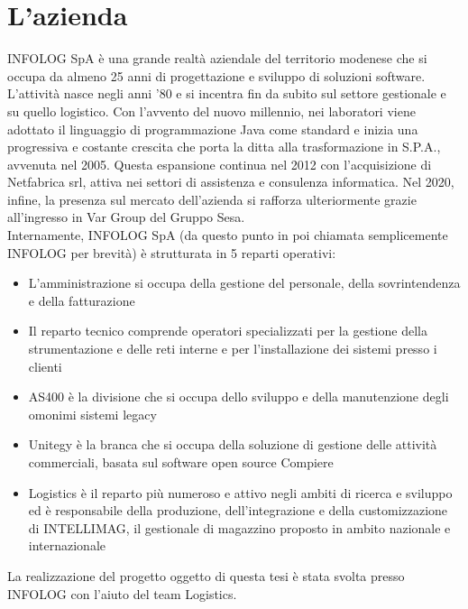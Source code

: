 \chapter{L'azienda}\label{c:company}

INFOLOG SpA è una grande realtà aziendale del territorio modenese che si occupa da almeno 25 anni di progettazione e sviluppo di soluzioni software.
L'attività nasce negli anni '80 e si incentra fin da subito sul settore gestionale e su quello logistico.
Con l'avvento del nuovo millennio, nei laboratori viene adottato il linguaggio di programmazione Java come standard e inizia una progressiva e costante crescita
che porta la ditta alla trasformazione in S.P.A., avvenuta nel 2005.
Questa espansione continua nel 2012 con l'acquisizione di Netfabrica srl, attiva nei settori di assistenza e consulenza informatica.
Nel 2020, infine, la presenza sul mercato dell'azienda si rafforza ulteriormente grazie all'ingresso in Var Group del Gruppo Sesa.
\\
Internamente, INFOLOG SpA (da questo punto in poi chiamata semplicemente INFOLOG per brevità) è strutturata in 5 reparti operativi:
\begin{itemize}
    \item L'amministrazione si occupa della gestione del personale, della sovrintendenza e della fatturazione
    \item Il reparto tecnico comprende operatori specializzati per la gestione della strumentazione e delle reti interne e per l'installazione dei sistemi presso i clienti
    \item AS400 è la divisione che si occupa dello sviluppo e della manutenzione degli omonimi sistemi legacy
    \item Unitegy è la branca che si occupa della soluzione di gestione delle attività commerciali, basata sul software open source Compiere
    \item Logistics è il reparto più numeroso e attivo negli ambiti di ricerca e sviluppo ed è responsabile della produzione, dell'integrazione e della customizzazione di INTELLIMAG, il gestionale di magazzino proposto in ambito nazionale e internazionale
\end{itemize}
La realizzazione del progetto oggetto di questa tesi è stata svolta presso INFOLOG con l'aiuto del team Logistics.